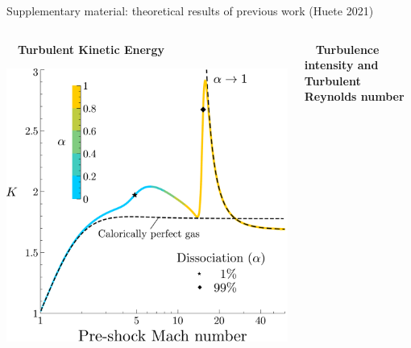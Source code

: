 \documentclass[9pt, aspectratio=1609]{beamer}
\begin{document}
\begin{frame}{\large Supplementary material: theoretical results of previous work (Huete 2021)}
    \begin{columns}[c]
    \begin{column}{.4\textwidth}%
    \begin{center}
        \vspace{-0.3cm}\textbf{$\quad$Turbulent Kinetic Energy}\\ \vspace{0.3cm}
        
        \includegraphics[width=1.1\textwidth]{figures/huete2021/tke_2.pdf}
    \end{center}
    \end{column}%
    \begin{column}{.45\textwidth}
    \begin{center}
        \vspace{-0.3cm}\textbf{$\quad$Turbulence intensity and Turbulent Reynolds number}\\ \vspace{0.3cm}
        

\end{center}
\end{column}
\end{columns}
\end{frame}
\end{document}
